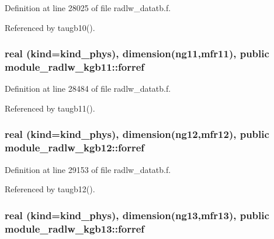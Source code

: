 Definition at line 28025 of file radlw\+\_\+datatb.\+f.



Referenced by taugb10().

\subsubsection[{\texorpdfstring{forref}{forref}}]{\setlength{\rightskip}{0pt plus 5cm}real (kind=kind\+\_\+phys), dimension(ng11,mfr11), public module\+\_\+radlw\+\_\+kgb11\+::forref}\hypertarget{group__module__radlw__main_ga9239d06fcd3fca0f13302c1ae4eb5a60}{}\label{group__module__radlw__main_ga9239d06fcd3fca0f13302c1ae4eb5a60}


Definition at line 28484 of file radlw\+\_\+datatb.\+f.



Referenced by taugb11().

\subsubsection[{\texorpdfstring{forref}{forref}}]{\setlength{\rightskip}{0pt plus 5cm}real (kind=kind\+\_\+phys), dimension(ng12,mfr12), public module\+\_\+radlw\+\_\+kgb12\+::forref}\hypertarget{group__module__radlw__main_ga97dac0d0e010441171e09e317e5aeee8}{}\label{group__module__radlw__main_ga97dac0d0e010441171e09e317e5aeee8}


Definition at line 29153 of file radlw\+\_\+datatb.\+f.



Referenced by taugb12().

\subsubsection[{\texorpdfstring{forref}{forref}}]{\setlength{\rightskip}{0pt plus 5cm}real (kind=kind\+\_\+phys), dimension(ng13,mfr13), public module\+\_\+radlw\+\_\+kgb13\+::forref}\hypertarget{group__module__radlw__main_ga93c6546ef5f8cbfc4f63de29e1ba2452}{}\label{group__module__radlw__main_ga93c6546ef5f8cbfc4f63de29e1ba2452}


